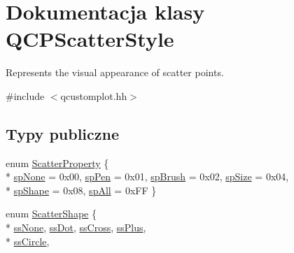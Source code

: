 \hypertarget{class_q_c_p_scatter_style}{}\section{Dokumentacja klasy Q\+C\+P\+Scatter\+Style}
\label{class_q_c_p_scatter_style}


Represents the visual appearance of scatter points.  




{\ttfamily \#include $<$qcustomplot.\+hh$>$}

\subsection*{Typy publiczne}
\begin{DoxyCompactItemize}
\item 
enum \hyperlink{class_q_c_p_scatter_style_a8974f6a20f8f6eea7781f0e6af9deb46}{Scatter\+Property} \{ \\*
\hyperlink{class_q_c_p_scatter_style_a8974f6a20f8f6eea7781f0e6af9deb46a5891be10bea382fad6c20f7737a2dd90}{sp\+None} = 0x00, 
\hyperlink{class_q_c_p_scatter_style_a8974f6a20f8f6eea7781f0e6af9deb46aa04d012e7c03e455db2b68fdd55c2a04}{sp\+Pen} = 0x01, 
\hyperlink{class_q_c_p_scatter_style_a8974f6a20f8f6eea7781f0e6af9deb46af0499b1fc04de2dcc7e47ff0ef75c904}{sp\+Brush} = 0x02, 
\hyperlink{class_q_c_p_scatter_style_a8974f6a20f8f6eea7781f0e6af9deb46a553ae95798ace9a328c7cd62045260b0}{sp\+Size} = 0x04, 
\\*
\hyperlink{class_q_c_p_scatter_style_a8974f6a20f8f6eea7781f0e6af9deb46a19c224563adb42c55fb8b7ae6904411b}{sp\+Shape} = 0x08, 
\hyperlink{class_q_c_p_scatter_style_a8974f6a20f8f6eea7781f0e6af9deb46af62509c0409467f387234274762e6f69}{sp\+All} = 0x\+FF
 \}
\item 
enum \hyperlink{class_q_c_p_scatter_style_adb31525af6b680e6f1b7472e43859349}{Scatter\+Shape} \{ \\*
\hyperlink{class_q_c_p_scatter_style_adb31525af6b680e6f1b7472e43859349abd144c291ca274f77053ec68cab6c022}{ss\+None}, 
\hyperlink{class_q_c_p_scatter_style_adb31525af6b680e6f1b7472e43859349a06e15a735b79093a1d999c0374fa3aa1}{ss\+Dot}, 
\hyperlink{class_q_c_p_scatter_style_adb31525af6b680e6f1b7472e43859349a9eacd60f059dc3ef71bf249f515a6fe4}{ss\+Cross}, 
\hyperlink{class_q_c_p_scatter_style_adb31525af6b680e6f1b7472e43859349a2d7f1d3c1a148b9d9d17f2fd9cae5eb7}{ss\+Plus}, 
\\*
\hyperlink{class_q_c_p_scatter_style_adb31525af6b680e6f1b7472e43859349a7c92a110880d0ef2170dff3a5b4f7779}{ss\+Circle}, 

\end{DoxyCompactItemize}
